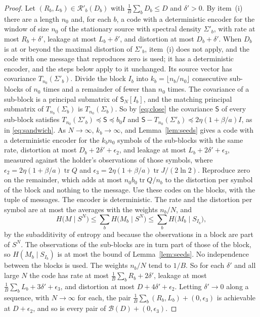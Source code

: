 \documentclass[11pt,onecolumn]{IEEEtran}
\newcommand{\tr}{\operatorname{tr}}
\begin{document}
\begin{proof}
Let $(R_b,L_b)\in\mathcal R'_b(D_b)$ with $\tfrac1B\sum_bD_b\le D$ and
$\delta'>0$. By item~(i) there are a length $n_0$ and, for each $b$, a
code with a deterministic encoder for the window of size $n_0$ of the
stationary source with spectral density $\Sigma'_b$, with rate at most
$R_b+\delta'$, leakage at most $L_b+\delta'$, and distortion at most
$D_b+\delta'$. When $D_b$ is at or beyond the maximal distortion of
$\Sigma'_b$, item~(i) does not apply, and the code with one message that
reproduces zero is used; it has a deterministic encoder, and the steps
below apply to it unchanged. Its source vector has covariance
$T_{n_0}(\Sigma'_b)$.
Divide the block $I_b$ into $k_b=\lfloor n_b/n_0\rfloor$ consecutive
sub-blocks of $n_0$ times and a remainder of fewer than $n_0$ times.
The covariance of a sub-block is a principal submatrix of
$\mathsf S_N[I_b]$, and the matching principal submatrix of
$T_{n_b}(\Sigma_b)$ is $T_{n_0}(\Sigma_b)$. So by \eqref{eq:close} the
covariance $\mathsf S$ of every sub-block satisfies
$T_{n_0}(\Sigma'_b)\preceq\mathsf S\preceq b_0I$ and
$\mathsf S-T_{n_0}(\Sigma'_b)\preceq2\eta(1+\beta/a)I$, as in
\eqref{eq:sandwich}. As $N\to\infty$, $k_b\to\infty$, and
Lemma~\ref{lem:seeds} gives a code with a deterministic encoder for
the $k_bn_0$ symbols of the sub-blocks with the same rate, distortion
at most $D_b+2\delta'+\epsilon_2$, and leakage at most
$L_b+2\delta'+\epsilon_3$, measured against the holder's observations
of those symbols, where
$\epsilon_2=2\eta(1+\beta/a)\tr Q$ and
$\epsilon_3=2\eta(1+\beta/a)\tr J/(2\ln2)$. Reproduce zero on the
remainder, which adds at most $n_0b_0\tr Q/n_b$ to the distortion per
symbol of the block and nothing to the message. Use these codes on
the blocks, with the tuple of messages. The encoder is deterministic.
The rate and the distortion per symbol are at most the averages with
the weights $n_b/N$, and
\[
H\bigl(M\mid S^N\bigr)\le\sum_bH\bigl(M_b\mid S^N\bigr)\le\sum_bH\bigl(M_b\mid S_{I_b}\bigr),
\]
by the subadditivity of entropy and because the observations in a
block are part of $S^N$. The observations of the sub-blocks are in
turn part of those of the block, so $H(M_b\mid S_{I_b})$ is at most
the bound of Lemma~\ref{lem:seeds}. No independence between the blocks
is used. The weights $n_b/N$ tend to $1/B$. So for each $\delta'$ and
all large $N$ the code has rate at most
$\tfrac1B\sum_bR_b+2\delta'$, leakage at most
$\tfrac1B\sum_bL_b+3\delta'+\epsilon_3$, and distortion at most
$D+4\delta'+\epsilon_2$. Letting $\delta'\to0$ along a sequence, with
$N\to\infty$ for each, the pair
$\tfrac1B\sum_b(R_b,L_b)+(0,\epsilon_3)$ is achievable at
$D+\epsilon_2$, and so is every pair of
$\mathcal B(D)+(0,\epsilon_3)$.


\end{proof}
\end{document}
